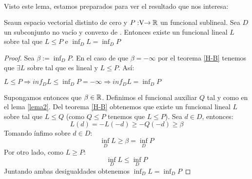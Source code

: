 	\paragraph{}Visto este lema, estamos preparados para ver el resultado que nos interesa:
	
	\begin{teoremaBox}
		Sea\vecSpace un espacio vectorial distinto de cero y $P:\vecSpace \rightarrow \RR$ un funcional sublineal.  Sea $ D $ un subconjunto no vacío y convexo de \vecSpace. Entonces existe un funcional lineal $ L $ sobre \vecSpace tal que $ L \leq P $ e $ \inf_D L = \inf_D P $
	\end{teoremaBox}
	\begin{proof}
		Sea $ \beta := \inf_D P $. En el caso de que $ \beta = -\infty $ por el teorema \ref{H-B} tenemos que $ \exists L $ sobre \vecSpace tal que es lineal y $ L \leq P$. Así:
		\begin{center}
			$ L \leq P \Longrightarrow inf_D L \leq \inf_D P = -\infty \Longrightarrow inf_D L = \inf_D P$ 
		\end{center}
		
		Supongamos entonces que $ \beta \in \mathbb{R} $. Definimos el funcional auxiliar $ Q $ tal y como en el lema \ref{lema2}. Del teorema \ref{H-B} obtenemos que existe un funcional lineal $ L $ sobre \vecSpace tal que $ L \leq Q$ (como $ Q \leq P $ tenemos que $ L \leq P $). Sea $ d \in D $, entonces:
		\[
		L(d) = -L(-d) \geq -Q(-d) \geq \beta
		\]
		Tomando ínfimo sobre $ d \in D $:
		\[
		\inf_D L \geq \beta = \inf_D P
		\]
		Por otro lado, como $ L \geq P $:
		\[
		\inf_D L \leq\inf_D P
		\]
		Juntando ambas desigualdades obtenemos $ \inf_D L =\inf_D P $
	\end{proof}

